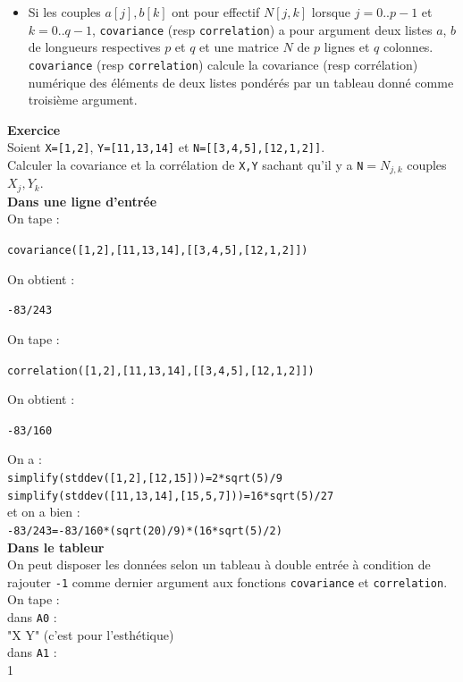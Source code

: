 \documentclass[a4paper,11pt]{book}
\begin{document}
\begin{itemize}
\item Si les couples $a[j],b[k]$ ont pour effectif $N[j,k]$ lorsque $j=0..p-1$ et
$k=0..q-1$, 
{\tt covariance} (resp {\tt correlation}) a pour argument deux listes $a$, $b$ 
de longueurs respectives $p$ et $q$ et une matrice $N$ de $p$ lignes et $q$ 
colonnes.\\
{\tt covariance} (resp {\tt correlation}) calcule la covariance (resp 
corr\'elation)  num\'erique des \'el\'ements de deux listes pond\'er\'es par 
un tableau donn\'e comme troisi\`eme argument.\\
\end{itemize}
{\bf Exercice}\\
Soient {\tt X=[1,2]}, {\tt Y=[11,13,14]} et {\tt N=[[3,4,5],[12,1,2]]}.\\
 Calculer la covariance et la corr\'elation de  {\tt X,Y} sachant qu'il y a
{\tt N}$= N_{j,k}$ couples $X_j,Y_k$.\\
{\bf Dans une ligne d'entr\'ee}\\
On tape :
\begin{center}{\tt covariance([1,2],[11,13,14],[[3,4,5],[12,1,2]])}\end{center}
On obtient :
\begin{center}{\tt -83/243}\end{center}
On tape :
\begin{center}{\tt correlation([1,2],[11,13,14],[[3,4,5],[12,1,2]])}\end{center}
On obtient :
\begin{center}{\tt -83/160}\end{center}
On a :\\
{\tt simplify(stddev([1,2],[12,15]))=2*sqrt(5)/9}\\
{\tt simplify(stddev([11,13,14],[15,5,7]))=16*sqrt(5)/27}\\
et on a bien :\\
{\tt -83/243=-83/160*(sqrt(20)/9)*(16*sqrt(5)/2)}\\
{\bf Dans le tableur}\\
On peut disposer les donn\'ees selon un tableau \`a double entr\'ee \`a 
condition de rajouter {\tt -1} comme dernier argument aux fonctions
{\tt covariance} et {\tt correlation}.\\
On tape :\\
dans {\tt A0} : \\
"X Y" (c'est pour l'esth\'etique)\\
dans {\tt A1} : \\
1\\
\end{document}
